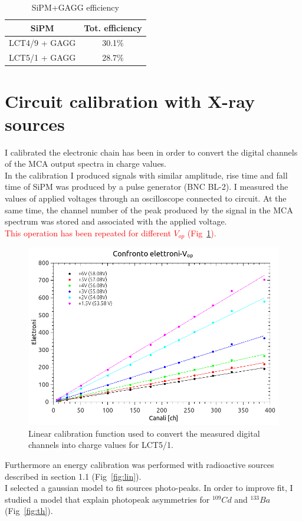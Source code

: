 \documentclass[10pt,a4paper, openany]{book}
\begin{document}
\begin{table}[h]
\begin{tabular}{cc}
\toprule
SiPM & Tot. efficiency \\
\midrule
LCT4/9 + GAGG& 30.1\% \\
LCT5/1 + GAGG& 28.7\% \\
\bottomrule
\end{tabular}
\caption{SiPM+GAGG efficiency}
\label{tab:eff}
\end{table}

\section{Circuit calibration with X-ray sources}
I calibrated the electronic chain has been in order to convert the digital channels of the MCA output spectra in charge values.\\
In the calibration I produced signals with similar amplitude, rise time and fall time of SiPM was produced by a pulse generator (BNC BL-2). I measured the values of applied voltages through an oscilloscope connected to circuit. At the same time, the channel number of the peak produced by the signal in the MCA spectrum was stored and associated with the applied voltage.\\
\textcolor{red}{This operation has been repeated for different $V_{op}$ (Fig~\ref{fig:lin1}).}

\begin{figure}[!h]
\begin{center}
\includegraphics[scale=0.4]{imm/confronto_tot.png}
\end{center}
\caption{Linear calibration function used to convert the measured digital channels into charge values for LCT5/1.}
\label{fig:lin1}
\end{figure}
Furthermore an energy calibration was performed with radioactive sources described in section 1.1 (Fig~\ref{fig:lin}).\\
I selected a gaussian model to fit sources photo-peaks.
In order to improve fit, I studied a model that explain photopeak asymmetries for $^{109}Cd$ and $^{133}Ba$ (Fig~\ref{fig:th}).
\end{document}

